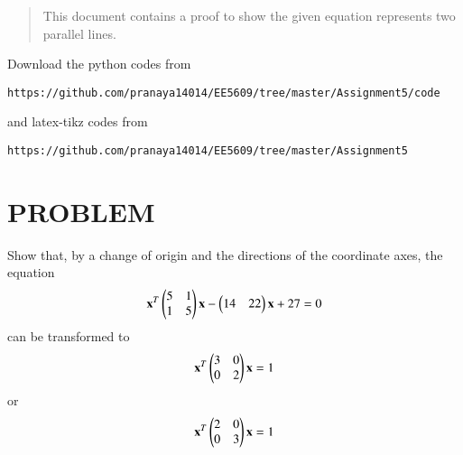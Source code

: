 \documentclass[journal,12pt,twocolumn]{IEEEtran}
\begin{document}
%
\begin{abstract}
This document contains a proof to show the given equation represents two parallel lines. 
\end{abstract}
Download the python codes from 
%
\begin{lstlisting}
https://github.com/pranaya14014/EE5609/tree/master/Assignment5/code
\end{lstlisting}
%
and latex-tikz codes from 
%
\begin{lstlisting}
https://github.com/pranaya14014/EE5609/tree/master/Assignment5
\end{lstlisting}
%
\section{PROBLEM}
Show that, by a change of origin and the directions of the coordinate axes, the equation
\begin{align}
\mathbf{x}^T\begin{pmatrix}5&1\\1&5\end{pmatrix}\mathbf{x}-\begin{pmatrix}14&22\end{pmatrix}\mathbf{x}+27 = 0\label{eq:0}
\end{align}
can be transformed to
\begin{align}
\mathbf{x}^T\begin{pmatrix}3&0\\0&2\end{pmatrix}\mathbf{x}=1
\end{align}
or
\begin{align}
\mathbf{x}^T\begin{pmatrix}2&0\\0&3\end{pmatrix}\mathbf{x}=1
\end{align}
\end{document}
